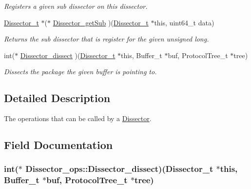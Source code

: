 \begin{DoxyCompactItemize}
\begin{DoxyCompactList}\small\item\em Registers a given sub dissector on this dissector. \end{DoxyCompactList}\item 
\hyperlink{struct_dissector}{Dissector\-\_\-t} $\ast$($\ast$ \hyperlink{struct_dissector__ops_ae44baede5c27c672485228b01be89f4f}{Dissector\-\_\-get\-Sub} )(\hyperlink{struct_dissector}{Dissector\-\_\-t} $\ast$this, uint64\-\_\-t data)
\begin{DoxyCompactList}\small\item\em Returns the sub dissector that is register for the given unsigned long. \end{DoxyCompactList}\item 
int($\ast$ \hyperlink{struct_dissector__ops_a1a584a8476cc37171505fac4157bc2cf}{Dissector\-\_\-dissect} )(\hyperlink{struct_dissector}{Dissector\-\_\-t} $\ast$this, Buffer\-\_\-t $\ast$buf, Protocol\-Tree\-\_\-t $\ast$tree)
\begin{DoxyCompactList}\small\item\em Dissects the package the given buffer is pointing to. \end{DoxyCompactList}\end{DoxyCompactItemize}


\subsection{Detailed Description}
The operations that can be called by a \hyperlink{struct_dissector}{Dissector}. 

\subsection{Field Documentation}
\hypertarget{struct_dissector__ops_a1a584a8476cc37171505fac4157bc2cf}{
\subsubsection[{Dissector\-\_\-dissect}]{\setlength{\rightskip}{0pt plus 5cm}int($\ast$ Dissector\-\_\-ops\-::\-Dissector\-\_\-dissect)({\bf Dissector\-\_\-t} $\ast$this, Buffer\-\_\-t $\ast$buf, Protocol\-Tree\-\_\-t $\ast$tree)}}\label{struct_dissector__ops_a1a584a8476cc37171505fac4157bc2cf}


